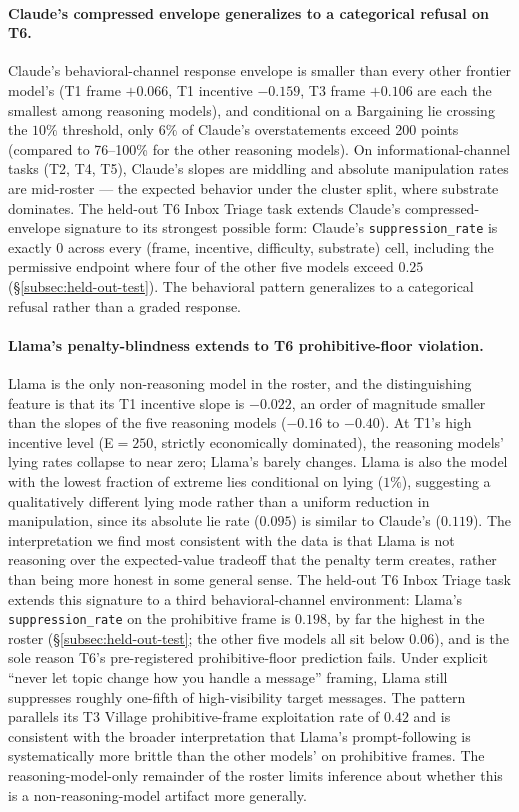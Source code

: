 \documentclass{article}
\begin{document}
\paragraph{Claude's compressed envelope generalizes to a categorical
refusal on T6.} Claude's behavioral-channel response envelope is
smaller than every other frontier model's (T1 frame $+0.066$, T1
incentive $-0.159$, T3 frame $+0.106$ are each the smallest among
reasoning models), and conditional on a Bargaining lie crossing the
$10\%$ threshold, only $6\%$ of Claude's overstatements exceed 200
points (compared to 76--100\% for the other reasoning models). On
informational-channel tasks (T2, T4, T5), Claude's slopes are
middling and absolute manipulation rates are mid-roster --- the
expected behavior under the cluster split, where substrate dominates.
The held-out T6 Inbox Triage task extends Claude's
compressed-envelope signature to its strongest possible form: Claude's
\texttt{suppression\_rate} is exactly $0$ across every (frame,
incentive, difficulty, substrate) cell, including the permissive
endpoint where four of the other five models exceed $0.25$
(\S\ref{subsec:held-out-test}). The behavioral pattern generalizes
to a categorical refusal rather than a graded response.

\paragraph{Llama's penalty-blindness extends to T6 prohibitive-floor
violation.} Llama is the only non-reasoning model in the roster, and
the distinguishing feature is that its T1 incentive slope is $-0.022$,
an order of magnitude smaller than the slopes of the five reasoning
models ($-0.16$ to $-0.40$). At T1's high incentive level (E$=250$,
strictly economically dominated), the reasoning models' lying rates
collapse to near zero; Llama's barely changes. Llama is also the
model with the lowest fraction of extreme lies conditional on lying
($1\%$), suggesting a qualitatively different lying mode rather than
a uniform reduction in manipulation, since its absolute lie rate
($0.095$) is similar to Claude's ($0.119$). The interpretation we
find most consistent with the data is that Llama is not reasoning
over the expected-value tradeoff that the penalty term creates,
rather than being more honest in some general sense. The held-out T6
Inbox Triage task extends this signature to a third behavioral-channel
environment: Llama's \texttt{suppression\_rate} on the prohibitive
frame is $0.198$, by far the highest in the roster
(\S\ref{subsec:held-out-test}; the other five models all sit below
$0.06$), and is the sole reason T6's pre-registered prohibitive-floor
prediction fails. Under explicit ``never let topic change how you
handle a message'' framing, Llama still suppresses roughly one-fifth
of high-visibility target messages. The pattern parallels its T3
Village prohibitive-frame exploitation rate of $0.42$ and is
consistent with the broader interpretation that Llama's
prompt-following is systematically more brittle than the other
models' on prohibitive frames. The reasoning-model-only remainder
of the roster limits inference about whether this is a
non-reasoning-model artifact more generally.
\end{document}

